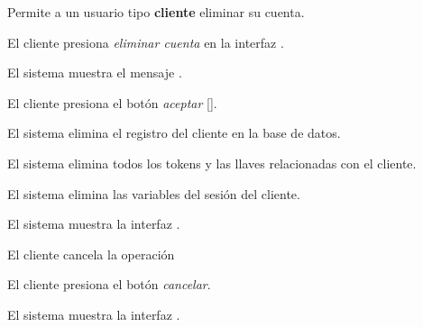 %
%

{
  Permite a un usuario tipo \textbf{cliente} eliminar su cuenta.

  \begin{trayectoriaPrincipal}

    \item El cliente presiona \textit{eliminar cuenta} en la
      interfaz .

    \item El sistema muestra el mensaje .

    \item El cliente presiona el botón \textit{aceptar}
      [].

    \item El sistema elimina el registro del cliente en la base de datos.

    \item El sistema elimina todos los tokens y las llaves relacionadas con el
      cliente.

    \item El sistema elimina las variables del sesión del cliente.

    \item El sistema muestra la interfaz .
  \end{trayectoriaPrincipal}

  \begin{trayectoriaAlternativa}[ta:cancelar]
    {El cliente cancela la operación}

    \item El cliente presiona el botón \textit{cancelar}.

    \item El sistema muestra la interfaz
      .

  \end{trayectoriaAlternativa}
}
